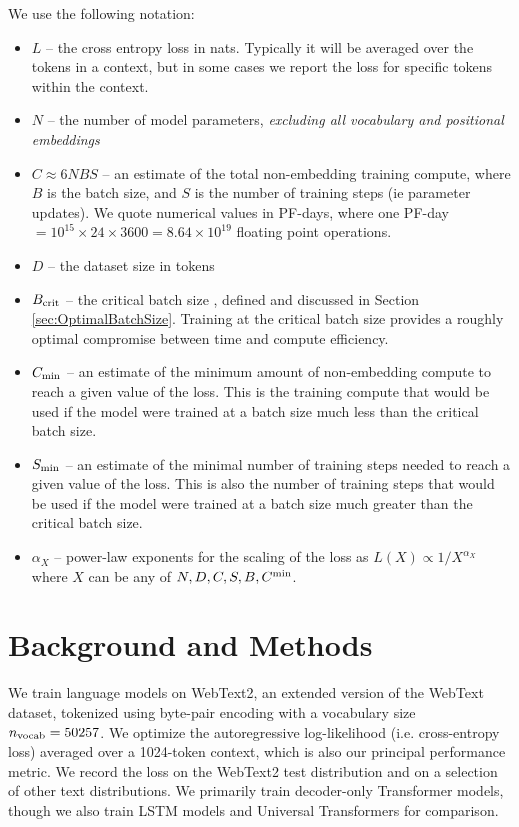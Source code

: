 \documentclass[english]{article}
\begin{document}
We use the following notation:
\begin{itemize}
\item $L$ -- the cross entropy loss in nats.  Typically it will be averaged over the tokens in a context, but in some cases we report the loss for specific tokens within the context.
\item $N$ -- the number of model parameters, \emph{excluding all vocabulary and positional embeddings}  
\item $C \approx 6 N B S$ -- an estimate of the total non-embedding training compute, where $B$ is the batch size, and $S$ is the number of training steps (ie parameter updates). We quote numerical values in PF-days, where one PF-day $ = 10^{15} \times 24 \times 3600 = 8.64 \times 10^{19}$ floating point operations.  
\item $D$ -- the dataset size in tokens
\item $B_{\rm crit}$ -- the critical batch size \cite{1812.06162}, defined and discussed in Section \ref{sec:OptimalBatchSize}.  Training at the critical batch size provides a roughly optimal compromise between time and compute efficiency.
\item $C_{\rm min}$ -- an estimate of the minimum amount of non-embedding compute to reach a given value of the loss.  This is the training compute that would be used if the model were trained at a batch size much less than the critical batch size.  
\item $S_{\rm min}$ -- an estimate of the minimal number of training steps needed to reach a given value of the loss.  This is also the number of training steps that would be used if the model were trained at a batch size much greater than the critical batch size.
\item $\alpha_X$ -- power-law exponents for the scaling of the loss as $L(X) \propto 1/X^{\alpha_X}$ where $X$ can be any of $N, D, C, S, B, C^{\rm min}$.
\end{itemize}

\section{Background and Methods}

We train language models on WebText2, an extended version of the WebText \cite{radford2019language} dataset, tokenized using byte-pair encoding \cite{BPE} with a vocabulary size $n_{\rm vocab} = 50257$.  We optimize the autoregressive log-likelihood (i.e. cross-entropy loss) averaged over a 1024-token context, which is also our principal performance metric.  We record the loss on the WebText2 test distribution and on a selection of other text distributions.  We primarily train decoder-only \cite{liu2018generating, radford2018improving} Transformer \cite{OriginalTransformer} models, though we also train LSTM models and Universal Transformers \cite{DBLP:journals/corr/abs-1807-03819}  for comparison.
\end{document}
